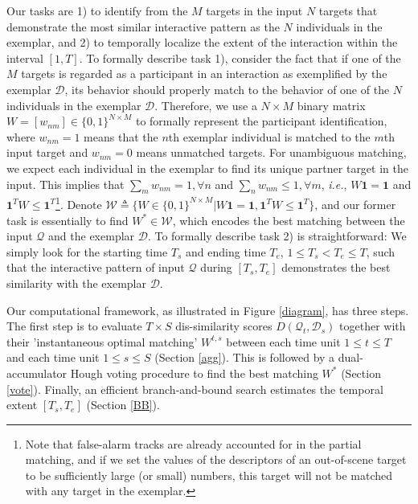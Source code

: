 Our tasks are 1) to identify from the $M$ targets in the input $N$ targets that demonstrate the most similar interactive pattern as the $N$ individuals in the exemplar, and 2) to temporally localize the extent of the interaction within the interval $[1, T]$. To formally describe task 1), consider the fact that if one of the $M$ targets is regarded as a participant in an interaction as exemplified by the exemplar $\mathcal{D}$, its behavior should properly match to the behavior of one of the $N$ individuals in the exemplar $\mathcal{D}$. Therefore, we use a $N\times M$ binary matrix $W=[w_{nm}]\in\{0,1\}^{N\times M}$ to formally represent the participant identification, where $w_{nm}=1$ means that the $n$th exemplar individual is matched to the $m$th input target and $w_{nm}=0$ means unmatched targets. For unambiguous matching, we expect each individual in the exemplar to find its unique partner target in the input. This implies that $\sum_{m}w_{nm}=1, \forall n$ and $\sum_{n}w_{nm}\leq 1, \forall m$, \textit{i.e.}, $W\mathbf{1}=\mathbf{1}$ and $\mathbf{1}^{T}W\leq\mathbf{1}^{T}$\footnote{Note that false-alarm tracks are already accounted for in the partial matching, and if we set the values of the descriptors of an out-of-scene target to be sufficiently large (or small) numbers, this target will not be matched with any target in the exemplar.}. Denote $\mathcal{W}\triangleq\{W\in\{0,1\}^{N\times M}| W\mathbf{1}=\mathbf{1}, \mathbf{1}^{T}W\leq\mathbf{1}^{T}\}$, and our former task is essentially to find $W^{*}\in\mathcal{W}$, which encodes the best matching between the input $\mathcal{Q}$ and the exemplar $\mathcal{D}$. To formally describe task 2) is straightforward: We simply look for the starting time $T_{s}$ and ending time $T_{e}$, $1\le T_{s}<T_{e}\le T$, such that the interactive pattern of input $\mathcal{Q}$ during $[T_{s}, T_{e}]$ demonstrates the best similarity with the exemplar $\mathcal{D}$.

Our computational framework, as illustrated in Figure \ref{diagram}, has three steps. The first step is to evaluate $T\times S$ dis-similarity scores $D(\mathcal{Q}_{t}, \mathcal{D}_{s})$ together with their 'instantaneous optimal matching' $W^{t,s}$ between each time unit  $1\le t\le T$ and each time unit  $1\le s\le S$ (Section \ref{agg}). This is followed by a dual-accumulator Hough voting procedure to find the best matching $W^{*}$ (Section \ref{vote}). Finally, an efficient branch-and-bound search estimates the temporal extent $[T_{s}, T_{e}]$ (Section \ref{BB}).  